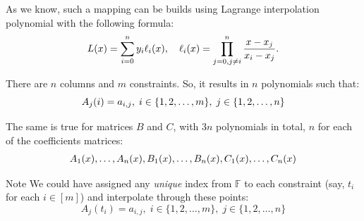 \documentclass{zkdl-presentation-template}
\begin{document}
    \begin{frame}
        As we know, such a mapping can be builds using Lagrange interpolation polynomial with the
        following formula:
        \vspace{-10pt}
        \begin{equation*}
            L(x) = \sum_{i=0}^{n} y_i \ell_i(x), \quad \ell_i(x) = \prod_{j=0, j \neq i}^{n} \frac{x-x_j}{x_i-x_j}.
            \vspace{-10pt}
        \end{equation*}  

        \pause
        There are $n$ columns and $m$ constraints. So, it results in $n$ polynomials such that:
        \vspace{-10pt}
        \begin{equation*}
            A_j(i) = a_{i,j}, \; i \in \{1,2,\dots,m\}, \; j \in \{1,2,\dots,n\}
            \vspace{-10pt}
        \end{equation*}

        \pause
        The same is true for matrices $B$ and $C$, with $3n$ polynomials in total, $n$ for each of the
        coefficients matrices:
        \vspace{-8pt}
        \begin{align*}
            A_1(x), \dots, A_n(x), 
            B_1(x), \dots, B_n(x),
            C_1(x), \dots, C_n(x)
            \vspace{-10pt}
        \end{align*}

        \vspace{-10pt}
        \pause
        \begin{block}{Note}
            We could have assigned any \textit{unique} index from $\mathbb{F}$ to each constraint
            (say, $t_i$ for each $i \in [m]$) and interpolate through these points:
            \vspace{-8pt}
            \begin{equation*}
                A_j(t_i) = a_{i,j}, \; i \in \{1,2,\dots,m\}, \; j \in \{1,2,\dots,n\}
            \end{equation*}
        \end{block}
    \end{frame}
\end{document}
